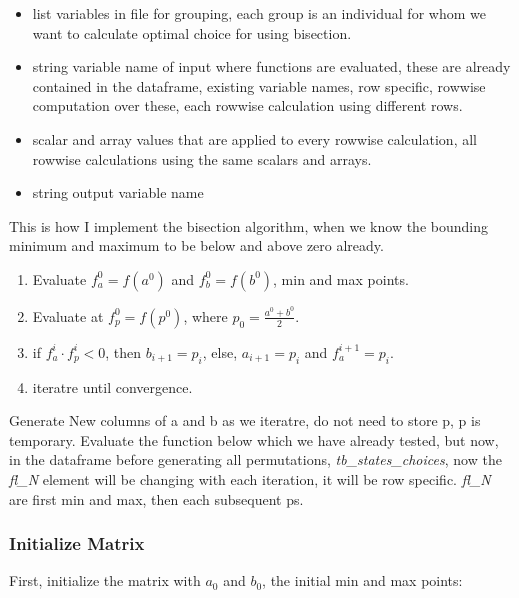 \documentclass[
]{book}
\providecommand{\tightlist}{%
  \setlength{\itemsep}{0pt}\setlength{\parskip}{0pt}}
\begin{document}
\begin{itemize}
\tightlist
\item
  list variables in file for grouping, each group is an individual for whom we want to calculate optimal choice for using bisection.
\item
  string variable name of input where functions are evaluated, these are already contained in the dataframe, existing variable names, row specific, rowwise computation over these, each rowwise calculation using different rows.
\item
  scalar and array values that are applied to every rowwise calculation, all rowwise calculations using the same scalars and arrays.
\item
  string output variable name
\end{itemize}

This is how I implement the bisection algorithm, when we know the bounding minimum and maximum to be below and above zero already.

\begin{enumerate}
\def\labelenumi{\arabic{enumi}.}
\tightlist
\item
  Evaluate \(f^0_a = f(a^0)\) and \(f^0_b = f(b^0)\), min and max points.
\item
  Evaluate at \(f^0_p = f(p^0)\), where \(p_0 = \frac{a^0+b^0}{2}\).
\item
  if \(f^i_a \cdot f^i_p < 0\), then \(b_{i+1} = p_i\), else, \(a_{i+1} = p_i\) and \(f^{i+1}_a = p_i\).
\item
  iteratre until convergence.
\end{enumerate}

Generate New columns of a and b as we iteratre, do not need to store p, p is temporary. Evaluate the function below which we have already tested, but now, in the dataframe before generating all permutations, \emph{tb\_states\_choices}, now the \emph{fl\_N} element will be changing with each iteration, it will be row specific. \emph{fl\_N} are first min and max, then each subsequent ps.

\hypertarget{initialize-matrix}{%
\subsubsection{Initialize Matrix}\label{initialize-matrix}}

First, initialize the matrix with \(a_0\) and \(b_0\), the initial min and max points:
\end{document}
